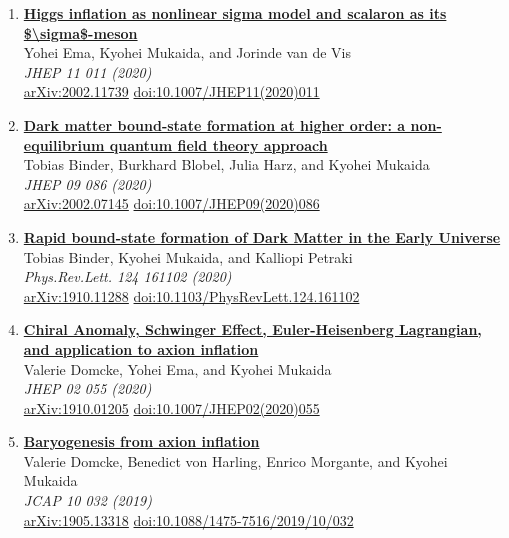 \begin{enumerate}
\item \textbf{\href{https://arxiv.org/abs/2002.11739}{Higgs inflation as nonlinear sigma model and scalaron as its \$\textbackslash{}sigma\$-meson}}\\
Yohei Ema, Kyohei Mukaida, and Jorinde van de Vis\\
\emph{JHEP 11 011 (2020)}
\\ \href{https://arxiv.org/abs/2002.11739}{arXiv:2002.11739} \href{https://doi.org/10.1007/JHEP11(2020)011}{doi:10.1007/JHEP11(2020)011}

\item \textbf{\href{https://arxiv.org/abs/2002.07145}{Dark matter bound-state formation at higher order: a non-equilibrium quantum field theory approach}}\\
Tobias Binder, Burkhard Blobel, Julia Harz, and Kyohei Mukaida\\
\emph{JHEP 09 086 (2020)}
\\ \href{https://arxiv.org/abs/2002.07145}{arXiv:2002.07145} \href{https://doi.org/10.1007/JHEP09(2020)086}{doi:10.1007/JHEP09(2020)086}

\item \textbf{\href{https://arxiv.org/abs/1910.11288}{Rapid bound-state formation of Dark Matter in the Early Universe}}\\
Tobias Binder, Kyohei Mukaida, and Kalliopi Petraki\\
\emph{Phys.Rev.Lett. 124 161102 (2020)}
\\ \href{https://arxiv.org/abs/1910.11288}{arXiv:1910.11288} \href{https://doi.org/10.1103/PhysRevLett.124.161102}{doi:10.1103/PhysRevLett.124.161102}

\item \textbf{\href{https://arxiv.org/abs/1910.01205}{Chiral Anomaly, Schwinger Effect, Euler-Heisenberg Lagrangian, and application to axion inflation}}\\
Valerie Domcke, Yohei Ema, and Kyohei Mukaida\\
\emph{JHEP 02 055 (2020)}
\\ \href{https://arxiv.org/abs/1910.01205}{arXiv:1910.01205} \href{https://doi.org/10.1007/JHEP02(2020)055}{doi:10.1007/JHEP02(2020)055}

\item \textbf{\href{https://arxiv.org/abs/1905.13318}{Baryogenesis from axion inflation}}\\
Valerie Domcke, Benedict von Harling, Enrico Morgante, and Kyohei Mukaida\\
\emph{JCAP 10 032 (2019)}
\\ \href{https://arxiv.org/abs/1905.13318}{arXiv:1905.13318} \href{https://doi.org/10.1088/1475-7516/2019/10/032}{doi:10.1088/1475-7516/2019/10/032}


\end{enumerate}

